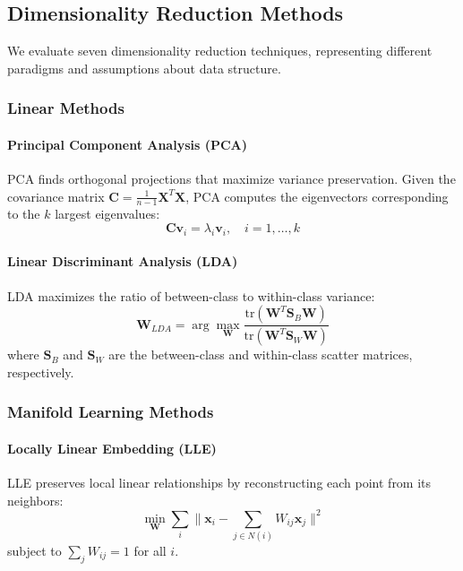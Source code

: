 \documentclass[review]{elsarticle}
\begin{document}
\subsection{Dimensionality Reduction Methods}
\label{sec:dr_methods}

We evaluate seven dimensionality reduction techniques, representing different paradigms and assumptions about data structure.

\subsubsection{Linear Methods}

\paragraph{Principal Component Analysis (PCA)}
PCA finds orthogonal projections that maximize variance preservation. Given the covariance matrix $\mathbf{C} = \frac{1}{n-1}\mathbf{X}^T\mathbf{X}$, PCA computes the eigenvectors corresponding to the $k$ largest eigenvalues:
\begin{equation}
\mathbf{C}\mathbf{v}_i = \lambda_i\mathbf{v}_i, \quad i = 1, \ldots, k
\end{equation}

\paragraph{Linear Discriminant Analysis (LDA)}
LDA maximizes the ratio of between-class to within-class variance:
\begin{equation}
\mathbf{W}_{LDA} = \arg\max_{\mathbf{W}} \frac{\text{tr}(\mathbf{W}^T\mathbf{S}_B\mathbf{W})}{\text{tr}(\mathbf{W}^T\mathbf{S}_W\mathbf{W})}
\end{equation}
where $\mathbf{S}_B$ and $\mathbf{S}_W$ are the between-class and within-class scatter matrices, respectively.

\subsubsection{Manifold Learning Methods}

\paragraph{Locally Linear Embedding (LLE)}
LLE preserves local linear relationships by reconstructing each point from its neighbors:
\begin{equation}
\min_{\mathbf{W}} \sum_i \|\mathbf{x}_i - \sum_{j \in N(i)} W_{ij}\mathbf{x}_j\|^2
\end{equation}
subject to $\sum_{j} W_{ij} = 1$ for all $i$.
\end{document}
